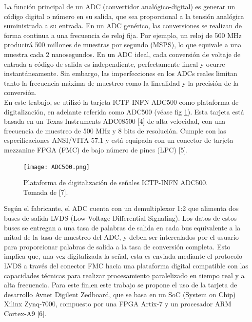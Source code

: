 \documentclass[]{book}
\begin{document}
\noindent La función principal de un ADC (convertidor analógico-digital) es generar un código digital o número en su salida, que sea proporcional a la tensión analógica suministrada a su entrada. En un ADC genérico, las conversiones se realizan de forma continua a una frecuencia de reloj fija. Por ejemplo, un reloj de 500 MHz producirá 500 millones de muestras por segundo (MSPS), lo que equivale a una muestra cada 2 nanosegundos. En un ADC ideal, cada conversión de voltaje de entrada a código de salida es independiente, perfectamente lineal y ocurre instantáneamente. Sin embargo, las imperfecciones en los ADCs reales limitan tanto la frecuencia máxima de muestreo como la linealidad y la precisión de la conversión. \\

\noindent En este trabajo, se utilizó la tarjeta ICTP-INFN ADC500 como plataforma de digitalización, en adelante referida como ADC500 (véase fig \ref*{fig:adc500}). Esta tarjeta está basada en un Texas Instruments ADC08500 [4] de alta velocidad, con una frecuencia de muestreo de 500 MHz y 8 bits de resolución. Cumple con las especificaciones ANSI/VITA 57.1 y está equipada con un conector de tarjeta mezzanine FPGA (FMC) de bajo número de pines (LPC) [5].\\

\begin{figure}[h]
    \centering
    \texttt{[image: ADC500.png]}
    \caption{Plataforma de digitalización de señales ICTP-INFN ADC500. Tomada de [7].}
    \label{fig:adc500}

\end{figure}

\noindent Según el fabricante, el ADC cuenta con un demultiplexor 1:2 que alimenta dos buses de salida LVDS (Low-Voltage Differential Signaling). Los datos de estos buses se entregan a una tasa de palabras de salida en cada bus equivalente a la mitad de la tasa de muestreo del ADC, y deben ser intercalados por el usuario para proporcionar palabras de salida a la tasa de conversión completa. Esto implica que, una vez digitalizada la señal, esta es enviada mediante el protocolo LVDS a través del conector FMC hacia una plataforma digital compatible con las capacidades técnicas para realizar procesamiento paralelizado en tiempo real y a alta frecuencia. Para este fin,en este trabajo se propone el uso de la tarjeta de desarrollo Avnet Digilent Zedboard, que se basa en un SoC (System on Chip) Xilinx Zynq-7000, compuesto por una FPGA Artix-7 y un procesador ARM Cortex-A9 [6].
\end{document}
